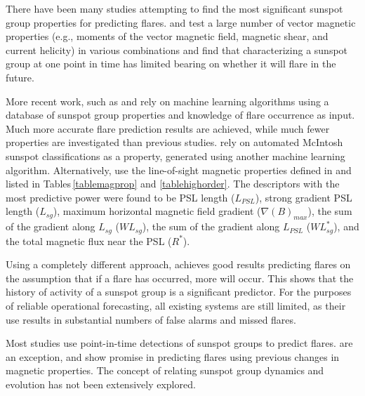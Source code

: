 There have been many studies attempting to find the most significant sunspot group properties for predicting flares. \cite{Leka:2003a,Leka:2003b,Leka:2007} and \cite{Barnes:2006} test a large number of vector magnetic properties (e.g., moments of the vector magnetic field, magnetic shear, and current helicity) in various combinations and find that characterizing a sunspot group at one point in time has limited bearing on whether it will flare in the future. 

More recent work, such as \cite{Colak:2009} and \cite{Ahmed:2011} rely on machine learning algorithms using a database of sunspot group properties and knowledge of flare occurrence as input. Much more accurate flare prediction results are achieved, while much fewer properties are investigated than previous studies.  \cite{Colak:2009} rely on automated McIntosh sunspot classifications as a property, generated using another machine learning algorithm. Alternatively, \cite{Ahmed:2011} use the line-of-sight magnetic properties defined in \cite{higgins:2011} and listed in Tables\,\ref{tablemagprop} and \ref{tablehighorder}. The descriptors with the most predictive power were found to be \gls{PSL} length ($L_{PSL}$), strong gradient \gls{PSL} length ($L_{sg}$), maximum horizontal magnetic field gradient ($\nabla( B)_{max}$), the sum of the gradient along $L_{sg}$ ($WL_{sg}$), the sum of the gradient along $L_{PSL}$ ($WL^*_{sg}$), and the total magnetic flux near the \gls{PSL} ($R^*$).

Using a completely different approach, \cite{Wheatland:2005} achieves good results predicting flares on the assumption that if a flare has occurred, more will occur. This shows that the history of activity of a sunspot group is a significant predictor. For the purposes of reliable operational forecasting, all existing systems are still limited, as their use results in substantial numbers of false alarms and missed flares. 

Most studies use point-in-time detections of sunspot groups to predict flares. \cite{Mason:2010} are an exception, and show promise in predicting flares using previous changes in magnetic properties. %
The concept of relating sunspot group dynamics and evolution has not been extensively explored.


